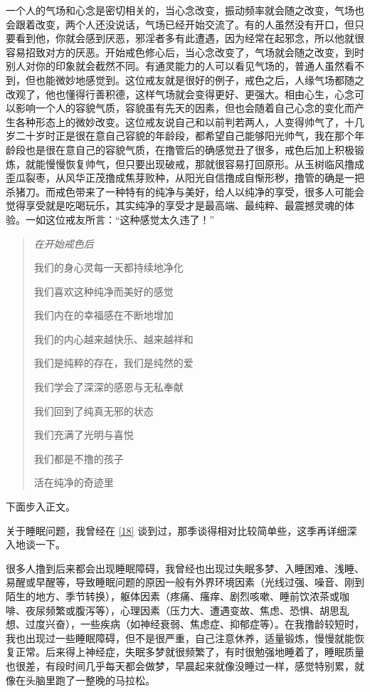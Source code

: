 \begin{case}
    一个人的气场和心念是密切相关的，当心念改变，振动频率就会随之改变，气场也会跟着改变，两个人还没说话，气场已经开始交流了。有的人虽然没有开口，但只要看到他，你就会感到厌恶，邪淫者多有此遭遇，因为经常在起邪念，所以他就很容易招致对方的厌恶。开始戒色修心后，当心念改变了，气场就会随之改变，到时别人对你的印象就会截然不同。有通灵能力的人可以看见气场的，普通人虽然看不到，但也能微妙地感觉到。这位戒友就是很好的例子，戒色之后，人缘气场都随之改观了，他也懂得行善积德，这样气场就会变得更好、更强大。相由心生，心念可以影响一个人的容貌气质，容貌虽有先天的因素，但也会随着自己心念的变化而产生各种形态上的微妙改变。这位戒友说自己和以前判若两人，人变得帅气了，十几岁二十岁时正是很在意自己容貌的年龄段，都希望自己能够阳光帅气，我在那个年龄段也是很在意自己的容貌气质，在撸管后的确感觉丑了很多，戒色后加上积极锻炼，就能慢慢恢复帅气，但只要出现破戒，那就很容易打回原形。从玉树临风撸成歪瓜裂枣，从风华正茂撸成焦芽败种，从阳光自信撸成自惭形秽，撸管的确是一把杀猪刀。而戒色带来了一种特有的纯净与美好，给人以纯净的享受，很多人可能会觉得享受就是吃喝玩乐，其实纯净的享受才是最高端、最纯粹、最震撼灵魂的体验。一如这位戒友所言：“这种感觉太久违了！”

    \begin{quotation}\it
        在开始戒色后

        我们的身心灵每一天都持续地净化

        我们喜欢这种纯净而美好的感觉

        我们内在的幸福感在不断地增加

        我们的内心越来越快乐、越来越祥和

        我们是纯粹的存在，我们是纯然的爱

        我们学会了深深的感恩与无私奉献

        我们回到了纯真无邪的状态

        我们充满了光明与喜悦

        我们都是不撸的孩子

        活在纯净的奇迹里
    \end{quotation}
\end{case}

下面步入正文。

关于睡眠问题，我曾经在 \ref{18} 谈到过，那季谈得相对比较简单些，这季再详细深入地谈一下。

很多人撸到后来都会出现睡眠障碍，我曾经也出现过失眠多梦、入睡困难、浅睡、易醒或早醒等，导致睡眠问题的原因一般有外界环境因素（光线过强、噪音、刚到陌生的地方、季节转换），躯体因素（疼痛、瘙痒、剧烈咳嗽、睡前饮浓茶或咖啡、夜尿频繁或腹泻等），心理因素（压力大、遭遇变故、焦虑、恐惧、胡思乱想、过度兴奋），一些疾病（如神经衰弱、焦虑症、抑郁症等）。在我撸龄较短时，我也出现过一些睡眠障碍，但不是很严重，自己注意休养，适量锻炼，慢慢就能恢复正常。后来得上神经症，失眠多梦就很频繁了，有时很勉强地睡着了，睡眠质量也很差，有段时间几乎每天都会做梦，早晨起来就像没睡过一样，感觉特别累，就像在头脑里跑了一整晚的马拉松。

